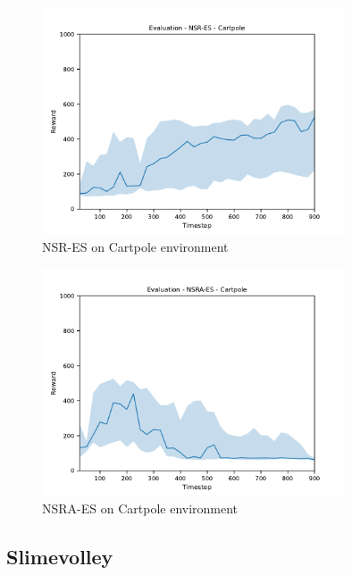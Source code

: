 \begin{figure}[H]
    \includegraphics[width=0.8\textwidth]{img/eval-cart-nsres.pdf}
    \caption{NSR-ES on Cartpole environment}
    \label{fig:cart-nsr}

\end{figure}
\begin{figure}[H]
    \includegraphics[width=0.8\textwidth]{img/eval-cart-nsraes.pdf}
    \caption{NSRA-ES on Cartpole environment}
    \label{fig:cart-nsra}

\end{figure}


\subsection{Slimevolley}

